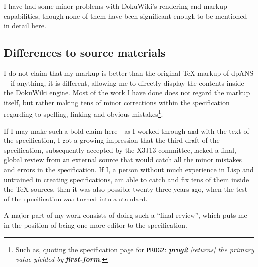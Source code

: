 I have had some minor problems with DokuWiki's rendering and markup capabilities, though none of them have been significant enough to be mentioned in detail here.

\subsection{Differences to source materials}

I do not claim that my markup is better than the original \TeX{} markup of dpANS---if anything, it is different, allowing me to directly display the contents inside the DokuWiki engine. Most of the work I have done does not regard the markup itself, but rather making tens of minor corrections within the specification regarding to spelling, linking and obvious mistakes\footnote{Such as, quoting the specification page for \texttt{PROG2}: \textit{\textbf{prog2} [returns] the primary value yielded by \textbf{first-form}.}}.

If I may make such a bold claim here - as I worked through and with the text of the specification, I got a growing impression that the third draft of the specification, subsequently accepted by the X3J13 committee, lacked a final, global review from an external source that would catch all the minor mistakes and errors in the specification. If I, a person without much experience in Lisp and untrained in creating specifications, am able to catch and fix tens of them inside the \TeX{} sources, then it was also possible twenty three years ago, when the test of the specification was turned into a standard.

A major part of my work consists of doing such a ``final review'', which puts me in the position of being one more editor to the \cl{} specification.
